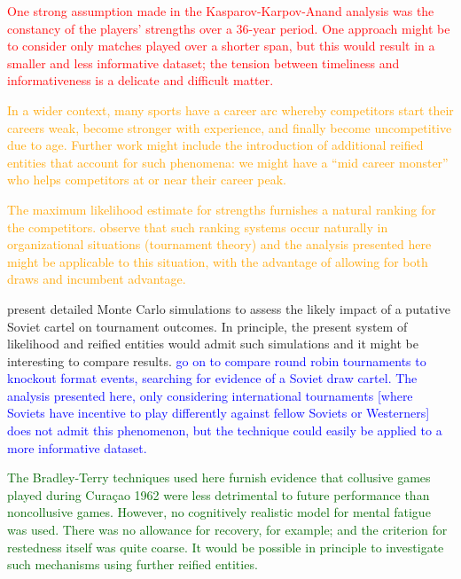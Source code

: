 \documentclass[review]{elsarticle}
\begin{document}
\textcolor{red}{One strong assumption made in the
  Kasparov-Karpov-Anand analysis was the constancy of the players'
  strengths over a 36-year period.  One approach might be to consider
  only matches played over a shorter span, but this would result in a
  smaller and less informative dataset; the tension between timeliness
  and informativeness is a delicate and difficult matter.}

\textcolor{orange}{In a wider context, many sports have a career arc
  whereby competitors start their careers weak, become stronger with
  experience, and finally become uncompetitive due to age.  Further
  work might include the introduction of additional reified entities
  that account for such phenomena: we might have a ``mid career
  monster'' who helps competitors at or near their career peak.}

\textcolor{orange}{The maximum likelihood estimate for strengths
  furnishes a natural ranking for the competitors.  \cite{lazear1981}
  observe that such ranking systems occur naturally in organizational
  situations (tournament theory) and the analysis presented here might
  be applicable to this situation, with the advantage of allowing for
  both draws and incumbent advantage.}
 
\cite{moul2009} present detailed Monte Carlo simulations to assess the
likely impact of a putative Soviet cartel on tournament outcomes.  In
principle, the present system of likelihood and reified entities would
admit such simulations and it might be interesting to compare results.
\textcolor{blue}{\cite{moul2009} go on to compare round robin
  tournaments to knockout format events, searching for evidence of a
  Soviet draw cartel.  The analysis presented here, only considering
  international tournaments [where Soviets have incentive to play
    differently against fellow Soviets or Westerners] does not admit
  this phenomenon, but the technique could easily be applied to a more
  informative dataset.}

\textcolor{DarkGreen}{The Bradley-Terry techniques used here furnish
  evidence that collusive games played during Cura\c{c}ao 1962 were
  less detrimental to future performance than noncollusive games.
  However, no cognitively realistic model for mental
  fatigue~\citep{boksem2008,linden2003} was used.  There was no
  allowance for recovery, for example; and the criterion for
  restedness itself was quite coarse.  It would be possible in
  principle to investigate such mechanisms using further reified
  entities.}
\end{document}
